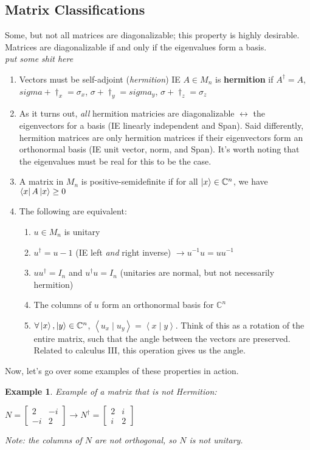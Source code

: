 \documentclass[12pt]{article}
\theoremstyle{plain}
\theoremstyle{nonumberplain}
\theoremstyle{plain}
\newtheorem{example}[lemma]{Example}
\theoremstyle{nonumberplain}
\newcommand\1{{\bf 1}}
\newcommand{\bmat}[1]{\begin{bmatrix*} #1 \end{bmatrix*}} %
\newcommand{\C}{\mathbb{C}} %
\newcommand{\<}{\left\langle}
\renewcommand{\>}{\right\rangle}
\newcommand{\inp}[2]{\left\langle#1\mid #2\right\rangle} %
\begin{document}
\subsection{Matrix Classifications}
Some, but not all matrices are diagonalizable; this property is highly desirable. Matrices are diagonalizable if and only if the eigenvalues form a basis. \\ \textit{put some shit here} \\
\begin{enumerate}
\item Vectors must be self-adjoint (\textit{hermition}) IE $A\in M_n$ is \textbf{hermition} if $A^\dagger=A$, $sigma+\dagger_x=\sigma_x$, $\sigma+\dagger_y=sigma_y$, $\sigma+\dagger_z=\sigma_z$
\item As it turns out, \textit{all} hermition matricies are diagonalizable $\longleftrightarrow$ the eigenvectors for a basis (IE linearly independent and Span). Said differently, hermition matrices are only hermition matrices if their eigenvectors form an orthonormal basis (IE unit vector, norm, and Span). It's worth noting that the eigenvalues must be real for this to be the case.
\item A matrix in $M_n$ is positive-semidefinite if for all $\ket{x}\in\C^n$, we have $\bra{x}A\ket{x}\geq0$
\item The following are equivalent:
\begin{enumerate}
\item $u\in M_n$ is unitary
\item $u^\dagger=u-1$ (IE left \textit{and} right inverse) $\longrightarrow u^{-1}u=uu^{-1}$
\item $uu^\dagger=I_n$ and $u^\dagger u=I_n$ (unitaries are normal, but not necessarily hermition)
\item The columns of $u$ form an orthonormal basis for $\C^n$
\item $\forall\ket{x},\ket{y}\in\C^n$, $\inp{u_x}{u_y}=\inp{x}{y}$. Think of this as a rotation of the entire matrix, such that the angle between the vectors are preserved. Related to calculus III, this operation gives us the angle.
\end{enumerate}
\end{enumerate}
Now, let's go over some examples of these properties in action.
\begin{example}
Example of a matrix that is \textit{not} Hermition:
\begin{center}
$N=\bmat{2 & -i \\ -i & 2}\longrightarrow N^\dagger=\bmat{2 & i \\ i & 2}$
\end{center} Note: the columns of $N$ are not orthogonal, so $N$ is not unitary.
\end{example}
\end{document}

